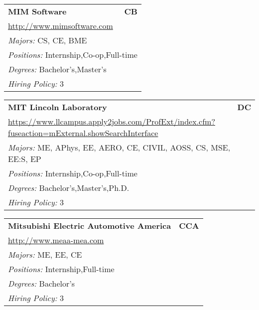 \documentclass[twoside]{article}
\begin{document}
\begin{center}
\begin{multicols}{3}
\begin{FlushLeft}
\begin{minipage}{.9\columnwidth}
\end{minipage}
 
\begin{minipage}{.9\columnwidth}\begin{tabularx}{.95\columnwidth}{Xr}
                 {\Large\bf MIM Software} & {\Large\bf CB}\\
    \multicolumn{2}{p{.95\columnwidth}}{\url{http://www.mimsoftware.com}}\\
    \multicolumn{2}{p{.95\columnwidth}}{\emph{Majors:} CS, CE, BME}\\
    \multicolumn{2}{p{.95\columnwidth}}{\emph{Positions:} Internship,Co-op,Full-time}\\
    \multicolumn{2}{p{.95\columnwidth}}{\emph{Degrees:} Bachelor's,Master's}\\
    \multicolumn{2}{p{.95\columnwidth}}{\emph{Hiring Policy:} 3}\\
    \end{tabularx}
    
\end{minipage}
 
\begin{minipage}{.9\columnwidth}\begin{tabularx}{.95\columnwidth}{Xr}
                 {\Large\bf MIT Lincoln Laboratory} & {\Large\bf DC}\\
    \multicolumn{2}{p{.95\columnwidth}}{\url{https://www.llcampus.apply2jobs.com/ProfExt/index.cfm?fuseaction=mExternal.showSearchInterface}}\\
    \multicolumn{2}{p{.95\columnwidth}}{\emph{Majors:} ME, APhys, EE, AERO, CE, CIVIL, AOSS, CS, MSE, EE:S, EP}\\
    \multicolumn{2}{p{.95\columnwidth}}{\emph{Positions:} Internship,Co-op,Full-time}\\
    \multicolumn{2}{p{.95\columnwidth}}{\emph{Degrees:} Bachelor's,Master's,Ph.D.}\\
    \multicolumn{2}{p{.95\columnwidth}}{\emph{Hiring Policy:} 3}\\
    \end{tabularx}
    
\end{minipage}
 
\begin{minipage}{.9\columnwidth}\begin{tabularx}{.95\columnwidth}{Xr}
                 {\Large\bf Mitsubishi Electric Automotive America} & {\Large\bf CCA}\\
    \multicolumn{2}{p{.95\columnwidth}}{\url{http://www.meaa-mea.com}}\\
    \multicolumn{2}{p{.95\columnwidth}}{\emph{Majors:} ME, EE, CE}\\
    \multicolumn{2}{p{.95\columnwidth}}{\emph{Positions:} Internship,Full-time}\\
    \multicolumn{2}{p{.95\columnwidth}}{\emph{Degrees:} Bachelor's}\\
    \multicolumn{2}{p{.95\columnwidth}}{\emph{Hiring Policy:} 3}\\
    \end{tabularx}
    

\end{minipage}
\end{FlushLeft}
\end{multicols}
\end{center}
\end{document}
